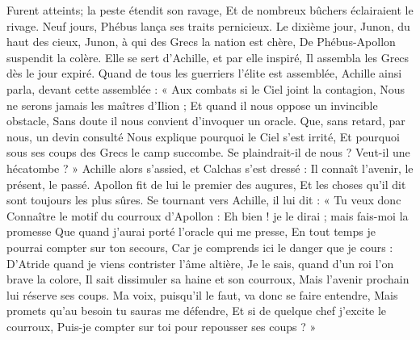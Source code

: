 \documentclass{article}
\begin{document}
{{Furent atteints; la peste étendit son ravage,
Et de nombreux bûchers éclairaient le rivage.
Neuf jours, Phébus lança ses traits pernicieux.
Le dixième jour, Junon, du haut des cieux,
Junon, à qui des Grecs la nation est chère,
De Phébus-Apollon suspendit la colère.
Elle se sert d'Achille, et par elle inspiré,
Il assembla les Grecs dès le jour expiré.
Quand de tous les guerriers l'élite est assemblée,
Achille ainsi parla, devant cette assemblée :
« Aux combats si le Ciel joint la contagion,
Nous ne serons jamais les maîtres d'Ilion ;
Et quand il nous oppose un invincible obstacle,
Sans doute il nous convient d'invoquer un oracle.
Que, sans retard, par nous, un devin consulté
Nous explique pourquoi le Ciel s'est irrité,
Et pourquoi sous ses coups des Grecs le camp succombe.
Se plaindrait-il de nous ? Veut-il une hécatombe ? »
Achille alors s'assied, et Calchas s'est dressé :
Il connaît l'avenir, le présent, le passé.
Apollon fit de lui le premier des augures,
Et les choses qu'il dit sont toujours les plus sûres.
Se tournant vers Achille, il lui dit : « Tu veux donc
Connaître le motif du courroux d'Apollon :
Eh bien ! je le dirai ; mais fais-moi la promesse
Que quand j'aurai porté l'oracle qui me presse,
En tout temps je pourrai compter sur ton secours,
Car je comprends ici le danger que je cours :
D'Atride quand je viens contrister l’âme altière,
Je le sais, quand d'un roi l'on brave la colore,
Il sait dissimuler sa haine et son courroux,
Mais l'avenir prochain  lui réserve ses coups.
Ma voix, puisqu'il le faut, va donc se faire entendre,
Mais promets qu'au besoin tu sauras me défendre,
Et si de quelque chef j'excite le courroux,
Puis-je compter sur toi pour repousser ses coups ? »
}}

\pend
\endnumbering
\end{document}
